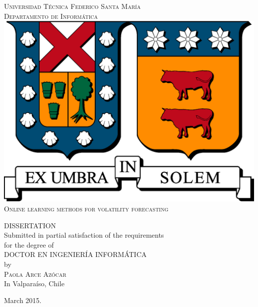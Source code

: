 \thispagestyle{empty}
\vspace{1.5in}
\begin{center}
{\textsc{Universidad T\'ecnica Federico Santa Mar\'ia}}\\
{\textsc{Departamento de Inform\'atica}}\\
\medskip
\includegraphics[scale=0.3]{img/logo_usm.eps}
\bigskip
\bigskip
\bigskip
\bigskip \\
{\textsc{\Large{{Online learning methods for volatility forecasting}}}}\\%

\bigskip
\bigskip
\bigskip
\bigskip
\bigskip 

{\MakeUppercase{Dissertation}\\
\bigskip
\bigskip
Submitted in partial satisfaction of the requirements\\
for the degree of\\
\bigskip
\bigskip
\MakeUppercase{Doctor en Ingenier\'ia Inform\'atica}\\
\bigskip
\bigskip
by\\
\bigskip
{\textsc{\large{Paola Arce Az\'ocar}}}\\
\bigskip
\bigskip
In Valpara\'iso, Chile}
\end{center}

\begin{center}
{\normalsize March 2015.}
\end{center}

\pagebreak

